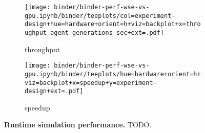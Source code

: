 \begin{figure*}

\begin{subfigure}{0.44\textwidth}
\texttt{[image: binder/binder-perf-wse-vs-gpu.ipynb/binder/teeplots/col=experiment-design+hue=hardware+orient=h+viz=backplot+x=throughput-agent-generations-sec+ext=.pdf]}
\caption{throughput}
\label{fig:perf:throughput}
\end{subfigure}%
\hfill
\begin{subfigure}{0.52\textwidth}
\texttt{[image: binder/binder-perf-wse-vs-gpu.ipynb/binder/teeplots/hue=hardware+orient=h+viz=backplot+x=speedup+y=experiment-design+ext=.pdf]}
\caption{speedup}
\label{fig:perf:speedup}
\end{subfigure}

\caption{
  \textbf{Runtime simulation performance.}
  \footnotesize
  TODO.
}
\label{fig:perf}
\end{figure*}
